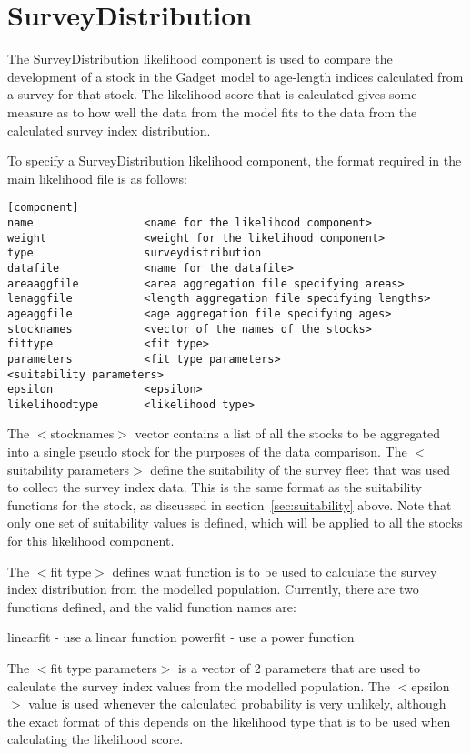 \documentclass[10pt,twoside]{book}
\begin{document}
\section{SurveyDistribution}\label{sec:surveydistribution}
The SurveyDistribution likelihood component is used to compare the development of a stock in the Gadget model to age-length indices calculated from a survey for that stock.  The likelihood score that is calculated gives some measure as to how well the data from the model fits to the data from the calculated survey index distribution.

\bigskip
To specify a SurveyDistribution likelihood component, the format required in the main likelihood file is as follows:

{\small\begin{verbatim}
[component]
name                 <name for the likelihood component>
weight               <weight for the likelihood component>
type                 surveydistribution
datafile             <name for the datafile>
areaaggfile          <area aggregation file specifying areas>
lenaggfile           <length aggregation file specifying lengths>
ageaggfile           <age aggregation file specifying ages>
stocknames           <vector of the names of the stocks>
fittype              <fit type>
parameters           <fit type parameters>
<suitability parameters>
epsilon              <epsilon>
likelihoodtype       <likelihood type>
\end{verbatim}}

The $<$stocknames$>$ vector contains a list of all the stocks to be aggregated into a single pseudo stock for the purposes of the data comparison.  The $<$suitability parameters$>$ define the suitability of the survey fleet that was used to collect the survey index data.  This is the same format as the suitability functions for the stock, as discussed in section~\ref{sec:suitability} above.  Note that only one set of suitability values is defined, which will be applied to all the stocks for this likelihood component.

\bigskip
The $<$fit type$>$ defines what function is to be used to calculate the survey index distribution from the modelled population.  Currently, there are two functions defined, and the valid function names are:

\bigskip
linearfit - use a linear function\newline
powerfit - use a power function

\bigskip
The $<$fit type parameters$>$ is a vector of 2 parameters that are used to calculate the survey index values from the modelled population.  The $<$epsilon$>$ value is used whenever the calculated probability is very unlikely, although the exact format of this depends on the likelihood type that is to be used when calculating the likelihood score.
\end{document}
